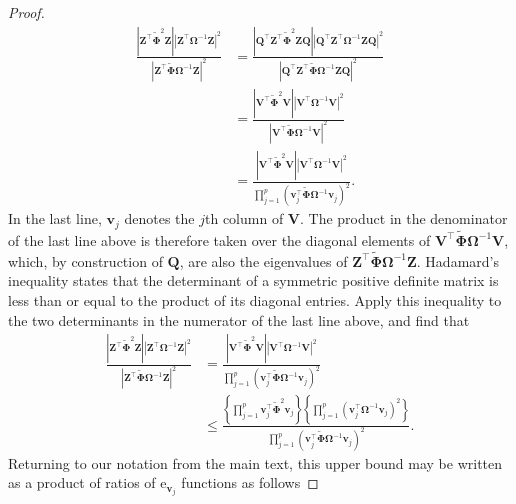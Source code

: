 \documentclass[12pt]{article}
\newcommand{\bl}[1]{{\mathbf #1}}
\newcommand{\bs}[1]{\boldsymbol #1}
\begin{document}
\begin{proof}
\begin{equation*}
    \begin{aligned}
        \frac{|\bl{Z}^\top \tilde{\bs{\Phi}}^2 \bl{Z}||\bl{Z}^\top \bs{\Omega}^{-1} \bl{Z}|^2}{|\bl{Z}^\top \tilde{\bs{\Phi}} \bs{\Omega}^{-1}\bl{Z}|^2} &= \frac{|\bl{Q}^\top \bl{Z}^\top \tilde{\bs{\Phi}}^2 \bl{Z} \bl{Q}||\bl{Q}^\top \bl{Z}^\top \bs{\Omega}^{-1} \bl{Z} \bl{Q}|^2}{|\bl{Q}^\top \bl{Z}^\top \tilde{\bs{\Phi}} \bs{\Omega}^{-1}\bl{Z}\bl{Q}|^2} \\
        &= \frac{|\bl{V}^\top \tilde{\bs{\Phi}}^2 \bl{V}||\bl{V}^\top \bs{\Omega}^{-1} \bl{V}|^2}{|\bl{V}^\top \tilde{\bs{\Phi}} \bs{\Omega}^{-1}\bl{V}|^2} \\
        &= \frac{|\bl{V}^\top \tilde{\bs{\Phi}}^2 \bl{V}||\bl{V}^\top \bs{\Omega}^{-1} \bl{V}|^2}{\prod_{j=1}^p (\bl{v}_j^\top \tilde{\bs{\Phi}} \bs{\Omega}^{-1} \bl{v}_j )^2}.
    \end{aligned}
\end{equation*}
In the last line, $\bl{v}_j$ denotes the $j$th column of $\bl{V}$. The product in the denominator of the last line above is therefore taken over the diagonal elements of $\bl{V}^\top \tilde{\bs{\Phi}} \bs{\Omega}^{-1}\bl{V}$, which, by construction of $\bl{Q}$, are also the eigenvalues of $\bl{Z}^\top \tilde{\bs{\Phi}} \bs{\Omega}^{-1}\bl{Z}$. Hadamard's inequality \citep{marshall_inequalities_2011} states that the determinant of a symmetric positive definite matrix is less than or equal to the product of its diagonal entries. Apply this inequality to the two determinants in the numerator of the last line above, and find that
\begin{equation*}
    \begin{aligned}
        \frac{|\bl{Z}^\top \tilde{\bs{\Phi}}^2 \bl{Z}||\bl{Z}^\top \bs{\Omega}^{-1} \bl{Z}|^2}{|\bl{Z}^\top \tilde{\bs{\Phi}} \bs{\Omega}^{-1}\bl{Z}|^2} &= \frac{|\bl{V}^\top \tilde{\bs{\Phi}}^2 \bl{V}||\bl{V}^\top \bs{\Omega}^{-1} \bl{V}|^2}{\prod_{j=1}^p (\bl{v}_j^\top \tilde{\bs{\Phi}} \bs{\Omega}^{-1} \bl{v}_j )^2} \\
        &\leq \frac{\left\{ \prod_{j=1}^p \bl{v}_j^\top \tilde{\bs{\Phi}}^2 \bl{v}_j  \right\}\left\{ \prod_{j=1}^p (\bl{v}_j^\top \bs{\Omega}^{-1} \bl{v}_j )^2 \right\}}{\prod_{j=1}^p (\bl{v}_j^\top \tilde{\bs{\Phi}} \bs{\Omega}^{-1} \bl{v}_j )^2}.
    \end{aligned}
\end{equation*}
Returning to our notation from the main text, this upper bound may be written as a product of ratios of $\mathrm{e}_{\bl{v}_j}$ functions as follows

\end{proof}
\end{document}
